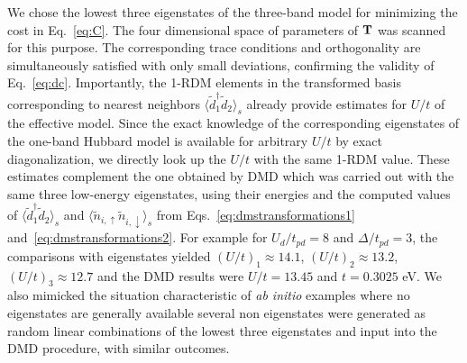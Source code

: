 We chose the lowest three eigenstates of the three-band model for minimizing 
the cost in Eq.~\eqref{eq:C}. The four dimensional space of parameters of ${\bf T}$ 
was scanned for this purpose. The corresponding trace conditions and orthogonality are simultaneously 
satisfied with only small deviations, confirming the validity of Eq.~\eqref{eq:dc}. 
Importantly, the 1-RDM elements in the transformed basis corresponding to nearest neighbors $\langle \tilde{d}_1^{\dagger} \tilde{d}_2 \rangle_s$ 
already provide estimates for $U/t$ of the effective model. Since the exact knowledge of the corresponding eigenstates of 
the one-band Hubbard model is available for arbitrary $U/t$ by exact diagonalization, we directly look up the $U/t$ with 
the same 1-RDM value. These estimates complement the one obtained by DMD which was carried out 
with the same three low-energy eigenstates, using their energies and 
the computed values of $\langle \tilde{d}_1^{\dagger} \tilde{d}_2 \rangle_s$ 
and $\langle \tilde{n}_{i,\uparrow} \tilde{n}_{i,\downarrow} \rangle_{s}$ from Eqs.~\eqref{eq:dmstransformations1} 
and~\eqref{eq:dmstransformations2}. 
For example for $U_{d}/t_{pd}=8$ and $\Delta/t_{pd}=3$, the comparisons with eigenstates yielded 
$(U/t)_1 \approx 14.1 $, $(U/t)_2 \approx 13.2 $, $(U/t)_3 \approx 12.7 $ and the DMD results were 
$U/t = 13.45 $ and $t = 0.3025 $ eV. We also mimicked the situation characteristic of \textit{ab initio} 
examples where no eigenstates are generally available several non eigenstates were generated as random linear combinations of 
the lowest three eigenstates and input into the DMD procedure, with 
similar outcomes.


